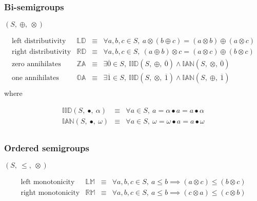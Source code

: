 \documentclass[10pt]{article}
\newcommand{\propname}[1]{{\mathbb{#1}}}
\begin{document}
\subsubsection{Bi-semigroups}

$(S,\ \oplus,\ \otimes)$

\[ 
\begin{array}{c|ccl} 
\mbox{left distributivity} 
    & \propname{LD}
    & \equiv 
    & \forall a, b, c \in S,\ a\otimes(b \oplus c) =  (a\otimes b) \oplus (a\otimes c) \\ 
\mbox{right distributivity} 
    & \propname{RD}
    & \equiv 
    & \forall a, b, c \in S,\ (a\oplus b)\otimes c  =   (a\otimes c) \oplus (b\otimes c)\\ 
\mbox{zero annihilates} 
    & \propname{ZA}
    & \equiv 
    & \exists \overline{0} \in S,\ \propname{IID}(S,\ \oplus,\ \overline{0}) \wedge \propname{IAN}(S,\ \otimes,\ \overline{0})  \\ 
\mbox{one annihilates} 
    & \propname{OA}
    & \equiv 
    & \exists \overline{1} \in S,\ \propname{IID}(S,\ \otimes,\ \overline{1}) \wedge \propname{IAN}(S,\ \oplus,\ \overline{1})  \\ 
\end{array} 
\] 
where 

\[ 
\begin{array}{rcl} 
\propname{IID}(S,\ \bullet,\ \alpha)  
    & \equiv 
    & \forall a\in S,\ a = \alpha \bullet a = a \bullet \alpha\\ 
\propname{IAN}(S,\ \bullet,\ \omega)  
    & \equiv 
    & \forall a\in S,\ \omega = \omega \bullet a = a \bullet \omega\\ 
\end{array} 
\] 


\subsubsection{Ordered semigroups}

$(S,\ \leq,\ \otimes)$

\[ 
\begin{array}{c|ccl} 
\mbox{left monotonicity} 
   & \propname{LM} 
   & \equiv 
   & \forall a, b, c \in S,\ a\leq b \implies (a\otimes c) \leq (b\otimes c) 
   \\ 
\mbox{right monotonicity} 
   & \propname{RM} 
   & \equiv 
   & \forall a, b, c \in S,\ a\leq b \implies (c\otimes a) \leq (c\otimes b)
   \\ 
\end{array} 
\] 
\end{document}
